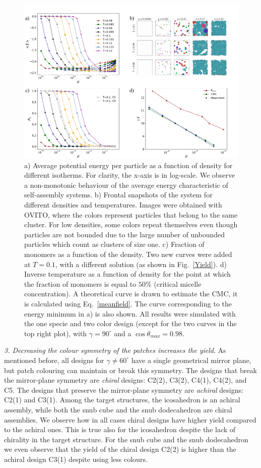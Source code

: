 \documentclass[a4paper, amsfonts, amssymb, amsmath, reprint, showkeys, nofootinbib, oneside]{revtex4-1}
\begin{document}
\begin{figure}[t]
	\includegraphics{fig5.pdf}
	\caption{\label{Energy} a) Average potential energy per particle as a function of density for different isotherms. For clarity, the x-axis is in log-scale. We observe a non-monotonic behaviour of the average energy characteristic of self-assembly systems. b) Frontal snapshots of the system for different densities and temperatures. Images were obtained with OVITO, where the colors represent particles that belong to the same cluster. For low densities, some colors repeat themselves even though particles are not bounded due to the large number of unbounded particles which count as clusters of size one. c) Fraction of monomers as a function of the density. Two new curves were added at $T=0.1$, with a different solution (as shown in Fig.~\ref{Yield}). d) Inverse temperature as a function of density for the point at which the fraction of monomers is equal to $50\%$ (critical micelle concentration). A theoretical curve is drawn to estimate the CMC, it is calculated using Eq.~\eqref{meanfield}. The curve corresponding to the energy minimum in a) is also shown. All results were simulated with the one specie and two color design (except for the two curves in the top right plot), with $\gamma=90^\circ$ and a $\cos\theta_{max}=0.98$.}
\end{figure}

\noindent
\emph{3. Decreasing the colour symmetry of the patches increases the yield}. As mentioned before, all designs for $\gamma\neq 60^\circ$ have a single geometrical mirror plane, but patch colouring can maintain or break this symmetry. The designs that break the mirror-plane symmetry are \emph{chiral} designs: C2(2), C3(2), C4(1), C4(2), and C5. The designs that preserve the mirror-plane symmetry are \emph{achiral} designs: C2(1) and C3(1). Among the target structures, the icosahedron is an achiral assembly, while both the snub cube and the snub dodecahedron are chiral assemblies. We observe how in all cases chiral designs have higher yield compared to the achiral ones. This is true also for the icosahedron despite the lack of chirality in the target structure. For the snub cube and the snub dodecahedron we even observe that the yield of the chiral design C2(2) is higher than the achiral design C3(1) despite using less colours.
\end{document}
